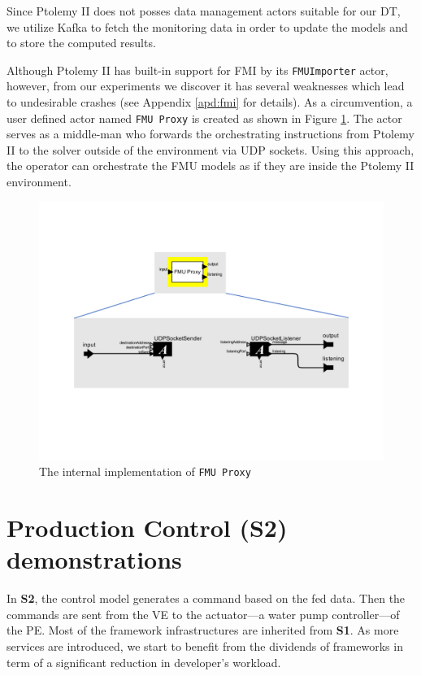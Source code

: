 Since Ptolemy II does not posses data management actors suitable for our DT, we utilize Kafka to fetch the monitoring data in order to update the models and to store the computed results.

Although Ptolemy II has built-in support for FMI by its \texttt{FMUImporter} actor, however, from our experiments we discover it has several weaknesses which lead to undesirable crashes (see Appendix \ref{apd:fmi} for details). As a circumvention, a user defined actor named \texttt{FMU Proxy} is created as shown in Figure \ref{fig:s1_pt_proxy}. The actor serves as a middle-man who forwards the orchestrating instructions from Ptolemy II to the solver outside of the environment via UDP sockets. Using this approach, the operator can orchestrate the FMU models as if they are inside the Ptolemy II environment.   

\begin{figure}[hbt!]
  \centering
  \includegraphics[scale=0.45]{figures/s1_pt_proxy.pdf}
  \caption{The internal implementation of \texttt{FMU Proxy}}
  \label{fig:s1_pt_proxy}
\end{figure}

\section{Production Control (S2) demonstrations}\label{sec:s2demo}
In \textbf{S2}, the control model generates a command based on the fed data. Then the commands are sent from the VE to the actuator---a water pump controller---of the PE. Most of the framework infrastructures are inherited from \textbf{S1}. As more services are introduced, we start to benefit from the dividends of frameworks in term of a significant reduction in developer's workload. 

